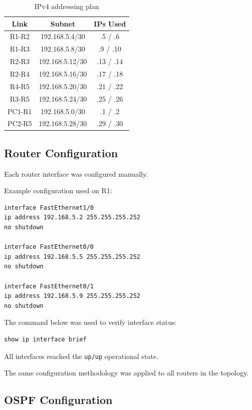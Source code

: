 \documentclass[12pt]{article}
\begin{document}
\begin{table}[H]
\centering
\begin{tabular}{ccc}
\toprule
\textbf{Link} & \textbf{Subnet} & \textbf{IPs Used} \\
\midrule
R1-R2 & 192.168.5.4/30 & .5 / .6 \\
R1-R3 & 192.168.5.8/30 & .9 / .10 \\
R2-R3 & 192.168.5.12/30 & .13 / .14 \\
R2-R4 & 192.168.5.16/30 & .17 / .18 \\
R4-R5 & 192.168.5.20/30 & .21 / .22 \\
R3-R5 & 192.168.5.24/30 & .25 / .26 \\
PC1-R1 & 192.168.5.0/30 & .1 / .2 \\
PC2-R5 & 192.168.5.28/30 & .29 / .30 \\
\bottomrule
\end{tabular}
\caption{IPv4 addressing plan}
\end{table}

\subsection{Router Configuration}

Each router interface was configured manually.

Example configuration used on R1:

\begin{lstlisting}
interface FastEthernet1/0
ip address 192.168.5.2 255.255.255.252
no shutdown

interface FastEthernet0/0
ip address 192.168.5.5 255.255.255.252
no shutdown

interface FastEthernet0/1
ip address 192.168.5.9 255.255.255.252
no shutdown
\end{lstlisting}

The command below was used to verify interface status:

\begin{lstlisting}
show ip interface brief
\end{lstlisting}

All interfaces reached the \texttt{up/up} operational state.

The same configuration methodology was applied to all routers in the topology.

\newpage
\subsection{OSPF Configuration}
\end{document}
